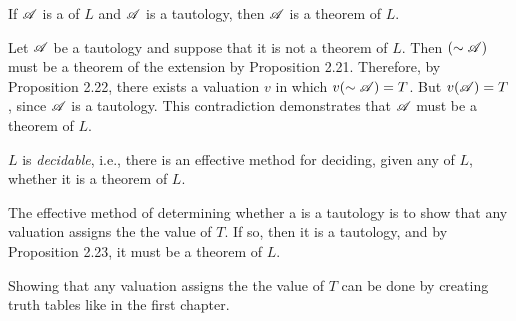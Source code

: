 \begin{proposition}
  If \(\mathscr{A}\) is a \wf{} of \(L\) and \(\mathscr{A}\) is a tautology, then \(\mathscr{A}\) is a theorem of \(L\).

  \prf{} Let \(\mathscr{A}\) be a tautology and suppose that it is not a theorem of \(L\). Then \((\sim\mathscr{A})\) must be a theorem of the extension \Lext{} by Proposition 2.21. Therefore, by Proposition 2.22, there exists a valuation \(v\) in which \(v(\sim\mathscr{A}) = T\). But \(v(\mathscr{A}) = T\), since \(\mathscr{A}\) is a tautology. This contradiction demonstrates that \(\mathscr{A}\) must be a theorem of \(L\).
\end{proposition}

\begin{proposition}
  \(L\) is \textit{decidable}, i.e., there is an effective method for deciding, given any \wf{} of \(L\), whether it is a theorem of \(L\).

  \prf{} The effective method of determining whether a \wf{} is a tautology is to show that any valuation assigns the \wf{} the value of \(T\). If so, then it is a tautology, and by Proposition 2.23, it must be a theorem of \(L\).

  \note{} Showing that any valuation assigns the \wf{} the value of \(T\) can be done by creating truth tables like in the first chapter.
\end{proposition}

\solutions{}

